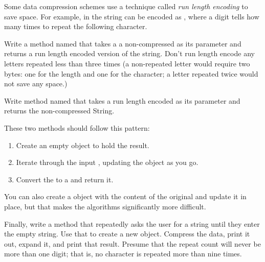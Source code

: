 \begin{exercise}
Some data compression schemes use a technique called {\em run length encoding} to save space. For example, in the string  can be encoded as , where a digit tells how many times to repeat the following character.

Write a method named  that takes a a non-compressed  as its parameter and returns a run length encoded version of the string. Don't run length encode any letters repeated less than three times (a non-repeated letter would require two bytes: one for the length and one for the character; a letter repeated twice would not save any space.)

Write method named  that takes a run length encoded  as its parameter and returns the non-compressed String.

These two methods should follow this pattern:

\begin{enumerate}
\item Create an empty  object to hold the result.
\item Iterate through the input , updating the  object as you go.
\item Convert the  to a  and return it.
\end{enumerate}

You can also create a  object with the content of the original  and update it in place, but that makes the algorithms significantly more difficult.

Finally, write a  method that repeatedly asks the user for a string until they enter the empty string. Use that  to create a new  object.  Compress the data, print it out, expand it, and print that result. Presume that the repeat count will never be more than one digit; that is, no character is repeated more than nine times.




\end{exercise}
